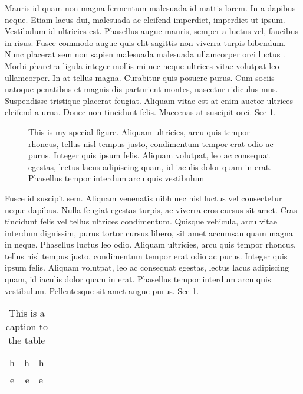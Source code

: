 Mauris id quam non magna fermentum malesuada id mattis lorem. In a dapibus neque. Etiam lacus dui, malesuada ac eleifend imperdiet, imperdiet ut ipsum. Vestibulum id ultricies est. Phasellus augue mauris, semper a luctus vel, faucibus in risus. Fusce commodo augue quis elit sagittis non viverra turpis bibendum. Nunc placerat sem non sapien malesuada malesuada ullamcorper orci luctus \cite{adams1980hitchhiker}. Morbi pharetra ligula integer mollis mi nec neque ultrices vitae volutpat leo ullamcorper. In at tellus magna. Curabitur quis posuere purus. Cum sociis natoque penatibus et magnis dis parturient montes, nascetur ridiculus mus. Suspendisse tristique placerat feugiat. Aliquam vitae est at enim auctor ultrices eleifend a urna. Donec non tincidunt felis. Maecenas at suscipit orci. See \cref{myFigure}.
\begin{figure}
    \centering
    \caption[Short caption to special figure]{This is my special figure. Aliquam ultricies, arcu quis tempor rhoncus, tellus nisl tempus justo, condimentum tempor erat odio ac purus. Integer quis ipsum felis. Aliquam volutpat, leo ac consequat egestas, lectus lacus adipiscing quam, id iaculis dolor quam in erat. Phasellus tempor interdum arcu quis vestibulum}
    \label{myFigure}
\end{figure}

Fusce id suscipit sem. Aliquam venenatis nibh nec nisl luctus vel consectetur neque dapibus. Nulla feugiat egestas turpis, ac viverra eros cursus sit amet. Cras tincidunt felis vel tellus ultrices condimentum. Quisque vehicula, arcu vitae interdum dignissim, purus tortor cursus libero, sit amet accumsan quam magna in neque. Phasellus luctus leo odio. Aliquam ultricies, arcu quis tempor rhoncus, tellus nisl tempus justo, condimentum tempor erat odio ac purus. Integer quis ipsum felis. Aliquam volutpat, leo ac consequat egestas, lectus lacus adipiscing quam, id iaculis dolor quam in erat. Phasellus tempor interdum arcu quis vestibulum. Pellentesque sit amet augue purus. See \cref{myTable}.

\begin{table}
    \centering
        \begin{tabular}{c | r l}
            h & h & h \\
            e & e & e \\
        \end{tabular}
    \caption{This is a caption to the table}
    \label{myTable}
\end{table}

